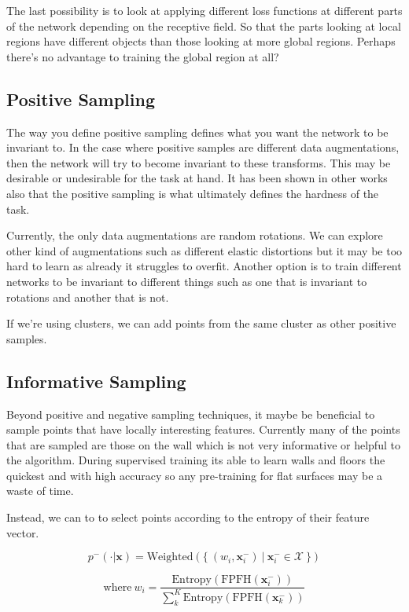 \documentclass[12pt]{article}
\begin{document}
The last possibility is to look at applying different loss functions at different parts of the network depending on the receptive field. So that the parts looking at local regions have different objects than those looking at more global regions. Perhaps there's no advantage to training the global region at all?

\subsection{Positive Sampling}

The way you define positive sampling defines what you want the network to be invariant to. In the case where positive samples are different data augmentations, then the network will try to become invariant to these transforms. This may be desirable or undesirable for the task at hand. It has been shown in other works also that the positive sampling is what ultimately defines the hardness of the task.
%

Currently, the only data augmentations are random rotations. We can explore other kind of augmentations such as different elastic distortions but it may be too hard to learn as already it struggles to overfit. Another option is to train different networks to be invariant to different things such as one that is invariant to rotations and another that is not.
%

If we're using clusters, we can add points from the same cluster as other positive samples.
%

\subsection{Informative Sampling}

Beyond positive and negative sampling techniques, it maybe be beneficial to sample points that have locally interesting features. Currently many of the points that are sampled are those on the wall which is not very informative or helpful to the algorithm. During supervised training its able to learn walls and floors the quickest and with high accuracy so any pre-training for flat surfaces may be a waste of time.

Instead, we can to to select points according to the entropy of their feature vector.

$$p^{-}( \cdot | \mathbf{x}) = \text{Weighted}(\{ \: (w_i, \mathbf{x}^-_i) \: | \: \mathbf{x}^-_i \in \mathcal{X} \: \})$$

$$\text{where} \: w_i = \frac{\text{Entropy}(\text{FPFH}(\mathbf{x}^-_i))}{\sum_k^K \text{Entropy}(\text{FPFH}(\mathbf{x}^-_k))}$$
\end{document}
